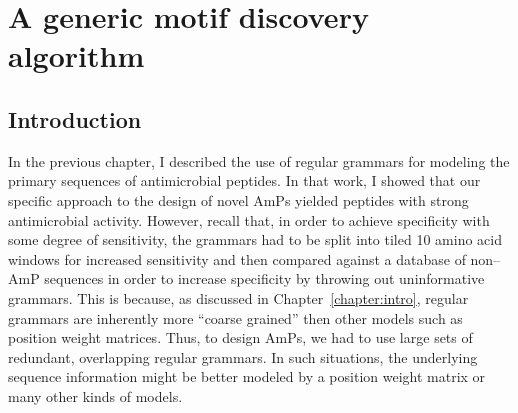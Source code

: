 
\chapter{A generic motif discovery algorithm}\label{chapter:gemoda}

\section{Introduction}
In the previous chapter, I described the use of regular grammars for
modeling the primary sequences of antimicrobial peptides.  In that
work, I showed that our specific approach to the design of novel
AmPs yielded peptides with strong antimicrobial activity.  However,
recall that, in order to achieve specificity with some degree of
sensitivity, the grammars had to be split into tiled 10 amino acid
windows for increased sensitivity and then compared against a
database of non--AmP sequences in order to increase specificity by
throwing out uninformative grammars.  This is because, as discussed
in Chapter~\vref{chapter:intro}, regular grammars are inherently
more ``coarse grained'' then other models such as position weight
matrices.  Thus, to design AmPs, we had to use large sets of
redundant, overlapping regular grammars.  In such situations, the
underlying sequence information might be better modeled by a
position weight matrix or many other kinds of models.

